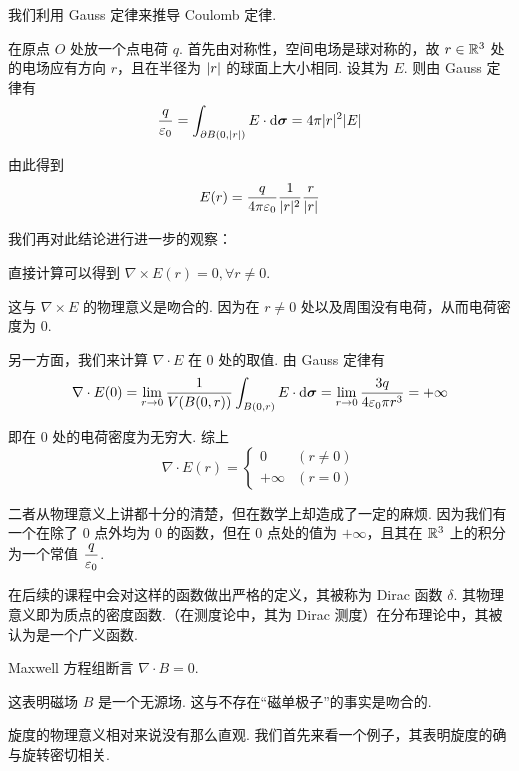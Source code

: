 \begin{example}[ Coulomb 定律]
    我们利用 Gauss 定律来推导 Coulomb 定律.

    在原点 $O$ 处放一个点电荷 $q$. 首先由对称性，空间电场是球对称的，故 $r\in\mathbb{R}^3$ 处的电场应有方向 $r$，且在半径为 $\lvert{r}\rvert$ 的球面上大小相同. 设其为 $E$. 则由 Gauss 定律有
$$
\frac{q}{\varepsilon_0}=\int_{\partial B(0,\lvert{r}\rvert)}E\cdot\mathrm{d}\bm{\sigma}=4\pi|r|^2|E|
$$

    由此得到
$$
E(r)=\frac{q}{4\pi\varepsilon_0}\frac{1}{\lvert{r}\rvert^2}\frac{r}{|r|}
$$

    我们再对此结论进行进一步的观察：

    直接计算可以得到 $\nabla\times E(r)=0,\forall r\ne 0$.

    这与 $\nabla\times E$ 的物理意义是吻合的. 因为在 $r\ne 0$ 处以及周围没有电荷，从而电荷密度为 $0$.

    另一方面，我们来计算 $\nabla\cdot E$ 在 $0$ 处的取值. 由 Gauss 定律有
$$
\nabla\cdot E(0)=\lim_{r\to 0}\frac{1}{V(B(0,r))}\int_{B(0,r)}E\cdot\mathrm{d}\bm{\sigma}=\lim_{r\to 0}\frac{3q}{4\varepsilon_0\pi r^3}=+\infty
$$

    即在 $0$ 处的电荷密度为无穷大. 综上
$$
\nabla\cdot E(r)=\begin{cases}
    0 & (r\ne 0)\\
    +\infty & (r=0)
\end{cases}
$$

    二者从物理意义上讲都十分的清楚，但在数学上却造成了一定的麻烦. 因为我们有一个在除了 $0$ 点外均为 $0$ 的函数，但在 $0$ 点处的值为 $+\infty$，且其在 $\mathbb{R}^3$ 上的积分为一个常值 $\dfrac{q}{\varepsilon_0}$.

    在后续的课程中会对这样的函数做出严格的定义，其被称为 Dirac 函数 $\delta$. 其物理意义即为质点的密度函数.（在测度论中，其为 Dirac 测度）在分布理论中，其被认为是一个广义函数.
\end{example}

\begin{example}
    Maxwell 方程组断言 $\nabla\cdot B=0$.

    这表明磁场 $B$ 是一个无源场. 这与不存在“磁单极子”的事实是吻合的.
\end{example}


旋度的物理意义相对来说没有那么直观. 我们首先来看一个例子，其表明旋度的确与旋转密切相关.

